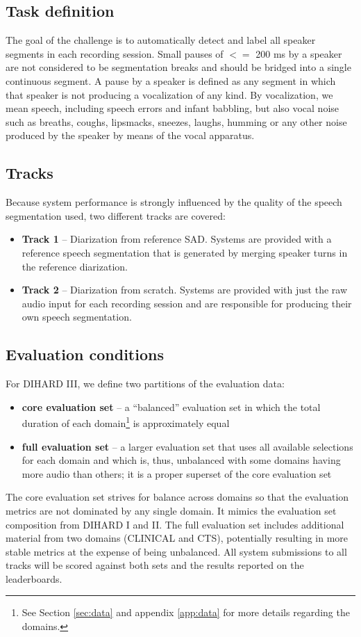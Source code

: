 \documentclass{article}
\begin{document}
\subsection{Task definition}
The goal of the challenge is to automatically detect and label all speaker segments in each recording session. Small pauses of $<=$ 200 ms by a speaker are not considered to be segmentation breaks and should be bridged into a single continuous segment. A pause by a speaker is defined as any segment in which that speaker is not producing a vocalization of any kind. By vocalization, we mean speech, including speech errors and infant babbling, but also vocal noise such as breaths, coughs, lipsmacks, sneezes, laughs, humming or any other noise produced by the speaker by means of the vocal apparatus.


\subsection{Tracks}
Because  system  performance  is  strongly  influenced  by  the  quality  of  the speech segmentation used, two different tracks are covered:
    \begin{itemize}
        \item {\bf Track 1}  --  Diarization from reference SAD. Systems are provided with a reference speech segmentation that is generated by merging speaker turns in the reference diarization.
        \item {\bf Track 2}  --  Diarization from scratch. Systems are provided with just the raw audio input for each recording session and are responsible for producing their own speech segmentation.
    \end{itemize}


\subsection{Evaluation conditions}
\label{sec:task:test}
For DIHARD III, we define two partitions of the evaluation data:
    \begin{itemize}
        \item {\bf core evaluation set}  --  a ``balanced'' evaluation set in which the total duration of each domain\footnote{See Section \ref{sec:data} and appendix \ref{app:data} for more details regarding the domains.} is approximately equal
        \item {\bf full evaluation set}  --  a larger evaluation set that uses all available selections for each domain and which is, thus, unbalanced with some domains having more audio than others; it is a proper superset of the core evaluation set
    \end{itemize}
The core evaluation set strives for balance across domains so that the evaluation metrics are not dominated by any single domain. It mimics the evaluation set composition from DIHARD I and II. The full evaluation set includes additional material from two domains (CLINICAL and CTS), potentially resulting in more stable metrics at the expense of being unbalanced. All system submissions to all tracks will be scored against both sets and the results reported on the leaderboards.
\end{document}
